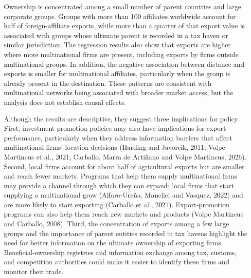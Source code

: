 \documentclass[11pt,a4paper]{article}
\begin{document}
Ownership is concentrated among a small number of parent countries and large corporate groups.
Groups with more than 100 affiliates worldwide account for half of foreign-affiliate exports, while
more than a quarter of that export value is associated with groups whose ultimate parent is
recorded in a tax haven or similar jurisdiction. The regression results also show that exports are
higher where more multinational firms are present, including exports by firms outside multinational
groups. In addition, the negative association between distance and exports is smaller for
multinational affiliates, particularly when the group is already present in the destination. These
patterns are consistent with multinational networks being associated with broader market access,
but the analysis does not establish causal effects.

Although the results are descriptive, they suggest three implications for policy. First,
investment-promotion policies may also have implications for export performance, particularly when
they address information barriers that affect multinational firms' location decisions (Harding and
Javorcik, 2011; Volpe Martincus et al., 2021; Carballo, Marra de Arti\~nano and Volpe Martincus,
2026). Second, local firms account for about half of agricultural exports but are smaller and reach
fewer markets. Programs that help them supply multinational firms may provide a channel through
which they can expand: local firms that start supplying a multinational grow (Alfaro-Ure\~na,
Manelici and Vasquez, 2022) and are more likely to start exporting (Carballo et al., 2021).
Export-promotion programs can also help them reach new markets and products (Volpe Martincus and
Carballo, 2008). Third, the concentration of exports among a few large groups and the importance
of parent entities recorded in tax havens highlight the need for better information on the ultimate
ownership of exporting firms. Beneficial-ownership registries and information exchange among tax,
customs, and competition authorities could make it easier to identify these firms and monitor their
trade.
\end{document}
